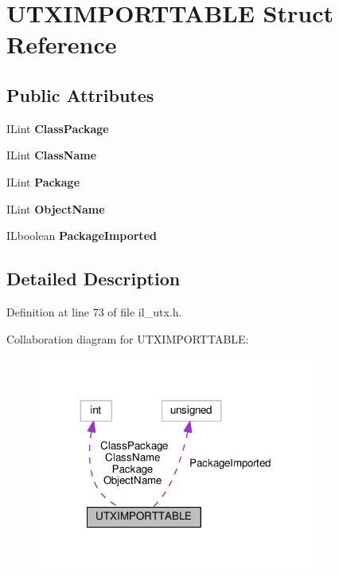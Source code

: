 \hypertarget{structUTXIMPORTTABLE}{}\section{U\+T\+X\+I\+M\+P\+O\+R\+T\+T\+A\+B\+LE Struct Reference}
\label{structUTXIMPORTTABLE}
\subsection*{Public Attributes}
\begin{DoxyCompactItemize}
\item 
\mbox{\label{structUTXIMPORTTABLE_a2f92ed0c1ca51b1e20f135b355f0cf7b}} 
I\+Lint {\bfseries Class\+Package}
\item 
\mbox{\label{structUTXIMPORTTABLE_a6a026ad76a4ed59720d2b4057c6250f2}} 
I\+Lint {\bfseries Class\+Name}
\item 
\mbox{\label{structUTXIMPORTTABLE_abe3af41736943cde23e9d9a4f005cedf}} 
I\+Lint {\bfseries Package}
\item 
\mbox{\label{structUTXIMPORTTABLE_a9bb68942e8631fc242e2c789cc5e762f}} 
I\+Lint {\bfseries Object\+Name}
\item 
\mbox{\label{structUTXIMPORTTABLE_aadaba51559fb1b43392156d37d53262a}} 
I\+Lboolean {\bfseries Package\+Imported}
\end{DoxyCompactItemize}


\subsection{Detailed Description}


Definition at line 73 of file il\+\_\+utx.\+h.



Collaboration diagram for U\+T\+X\+I\+M\+P\+O\+R\+T\+T\+A\+B\+LE\+:
\nopagebreak
\begin{figure}[H]
\begin{center}
\leavevmode
\includegraphics[width=260pt]{da/dc6/structUTXIMPORTTABLE__coll__graph}
\end{center}
\end{figure}


